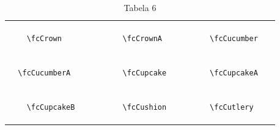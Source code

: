 \documentclass[x11names]{article}
\begin{document}
\begin{table}[H]
\begin{tabular}{|c|c|c|c|c|c|}
		&\multirow{5}{*}{	\fcCrown	[scale=0.64]} & &\multirow{5}{*}{	\fcCrownA	[scale=0.16]} & &\multirow{5}{*}{	\fcCucumber	[scale=0.16]}\\	& & & & & \\	& & & & & \\	\verb|	\fcCrown	| & & \verb|	\fcCrownA	| & & \verb|	\fcCucumber	| & \\	& & & & & \\	& & & & & \\	& & & & & \\	\hline									
		&\multirow{5}{*}{	\fcCucumberA	[scale=0.16]} & &\multirow{5}{*}{	\fcCupcake	[scale=0.64]} & &\multirow{5}{*}{	\fcCupcakeA	[scale=0.09]}\\	& & & & & \\	& & & & & \\	\verb|	\fcCucumberA	| & & \verb|	\fcCupcake	| & & \verb|	\fcCupcakeA	| & \\	& & & & & \\	& & & & & \\	& & & & & \\	\hline									
		&\multirow{5}{*}{	\fcCupcakeB	[scale=0.09]} & &\multirow{5}{*}{	\fcCushion	[scale=0.16]} & &\multirow{5}{*}{	\fcCutlery	[scale=0.16]}\\	& & & & & \\	& & & & & \\	\verb|	\fcCupcakeB	| & & \verb|	\fcCushion	| & & \verb|	\fcCutlery	| & \\	& & & & & \\	& & & & & \\	& & & & & \\		\hline 	\hline 	\end{tabular}	\caption{	Tabela 6	}\label{	Tab6	}\end{table}
\end{document}
